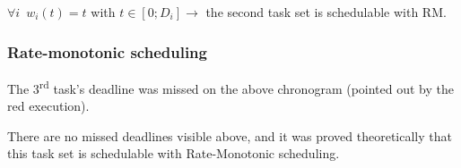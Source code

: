 \noindent $\forall i \enspace w_i(t) = t$ with $t \in [0;D_i] \rightarrow$ the second task set is schedulable with RM.

\subsubsection{Rate-monotonic scheduling}

\begin{RTGrid}[width=10cm]{3}{20}







\end{RTGrid}

The 3\textsuperscript{rd} task's deadline was missed on the above chronogram (pointed out by the red execution). \\

\begin{RTGrid}[width=10cm]{3}{22}







\end{RTGrid}

There are no missed deadlines visible above, and it was proved theoretically that this task set is schedulable with Rate-Monotonic scheduling.\\

